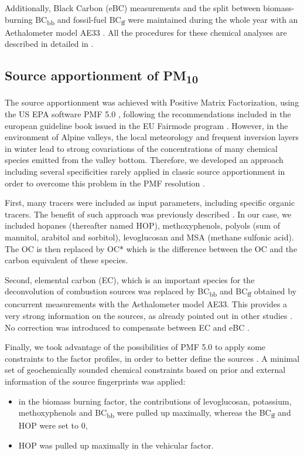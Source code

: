 \documentclass[acp, manuscript]{copernicus}
\begin{document}
Additionally, Black Carbon (eBC) measurements and the split between
biomass-burning BC\textsubscript{bb} and fossil-fuel BC\textsubscript{ff} were
maintained during the whole year with an Aethalometer model AE33
\citep{sandradewi_using_2008}. All the procedures for these chemical analyses
are described in detailed in \citet{chevrier_chauffage_2016}.

\subsection{\texorpdfstring{Source apportionment of PM\textsubscript{10}}{Source
apportionment of PM10}}\label{source-apportionment-of-pm10}

The source apportionment was achieved with Positive Matrix Factorization, using
the US EPA software PMF 5.0 \citep{us_epa_positive_2017}, following the
recommendations included in the european guideline book issued in the EU Fairmode program
\citep{belis_european_2014}. However, in the environment of Alpine valleys, the
local meteorology and frequent inversion layers in winter lead to strong
covariations of the concentrations of many chemical species emitted from the
valley bottom. Therefore, we developed an approach including several
specificities rarely applied in classic source apportionment in order to
overcome this problem in the PMF resolution \citep{chevrier_chauffage_2016}.

First, many tracers were included as input parameters, including specific
organic tracers. The benefit of such approach was previously described
\citep{golly_etude_2014,srivastava_speciation_2017,waked_source_2014}. In our
case, we included hopanes (thereafter named HOP), methoxyphenols, polyols (sum
of mannitol, arabitol and sorbitol), levoglucosan and MSA (methane sulfonic
acid). The OC is then replaced by OC* which is the difference between the OC and
the carbon equivalent of these species.

Second, elemental carbon (EC), which is an important species for the
deconvolution of combustion sources was replaced by
BC\textsubscript{bb} and BC\textsubscript{ff} obtained by concurrent
measurements with the Aethalometer model AE33. This provides a very strong
information on the sources, as already pointed out in other studies
\citep{petit_two_2015}. No correction was introduced to compensate between EC
and eBC \citep{zanatta_european_2016}.

Finally, we took advantage of the possibilities of PMF 5.0 to apply some
constraints to the factor profiles, in order to better define the sources
\citep{golly_etude_2014,srivastava_speciation_2017,salameh_impacts_2015}. A minimal set
of geochemically sounded chemical constraints based on prior and external
information of the source fingerprints was applied:
\begin{itemize}
    \item
        in the biomass burning factor, the contributions of levoglucosan, potassium,
        methoxyphenols and BC\textsubscript{bb} were pulled up maximally,
        whereas the BC\textsubscript{ff} and HOP were set to 0,
    \item
        HOP was pulled up maximally in the vehicular factor.
\end{itemize}
\end{document}
